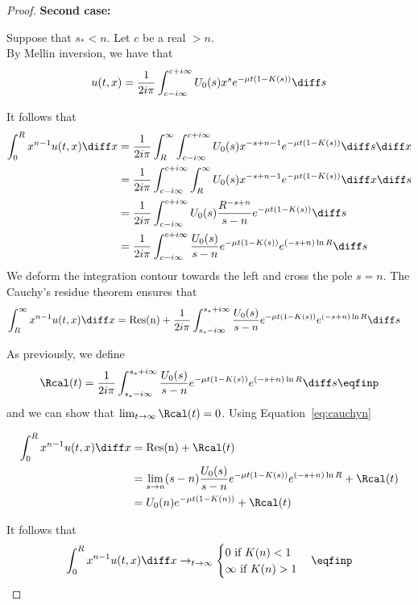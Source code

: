 \begin{proof}
\textbf{Second case:}

Suppose that $s_* < n$. Let $c$ be a real $>n$. \\
    By Mellin inversion, we have that
    \begin{align*}
        u(t,x) = \frac{1}{2i\pi}\int_{c-i\infty}^{c+i\infty} U_0(s) x^{s} e^{-\mu t(1 - K(s))} \diff s
    \end{align*}

It follows that
\begin{align*}
    \int_0^R x^{n-1}u(t,x) \diff x 
    &= \frac{1}{2i\pi} \int_R^{\infty} \int_{c-i\infty}^{c+i\infty} U_0(s) x^{-s+n-1} e^{-\mu t(1 - K(s))} \diff s \diff x \\
    &= \frac{1}{2i\pi} \int_{c-i\infty}^{c+i\infty} \int_R^{\infty} U_0(s) x^{-s+n-1} e^{-\mu t(1 - K(s))} \diff x \diff s \\
    &= \frac{1}{2i\pi} \int_{c-i\infty}^{c+i\infty} U_0(s) \frac{R^{-s+n}}{s-n} e^{-\mu t(1 - K(s))} \diff s \\
    &= \frac{1}{2i\pi} \int_{c-i\infty}^{c+i\infty} \frac{U_0(s)}{s-n} e^{-\mu t(1 - K(s))} e^{(-s+n)\ln R} \diff s
\end{align*}
We deform the integration contour towards the left and cross the pole $s = n$. The Cauchy's residue theorem ensures that
\begin{align}
    \int_R^{\infty} x^{n-1}u(t,x) \diff x &= \mathrm{Res(n)} + \frac{1}{2i\pi} \int_{s_*-i\infty}^{s_*+i\infty} \frac{U_0(s)}{s-n} e^{-\mu t(1 - K(s))} e^{(-s+n)\ln R} \diff s 
    \label{eq:cauchyn}
\end{align}


As previously, we define
\begin{align*}
    \Rcal(t) = \frac{1}{2i\pi} \int_{s_*-i\infty}^{s_*+i\infty} \frac{U_0(s)}{s-n} e^{-\mu t(1 - K(s))} e^{(-s+n)\ln R} \diff s
    \eqfinp
\end{align*}
and we can show that $\lim_{t\to\infty}\Rcal(t) = 0$. Using Equation~\ref{eq:cauchyn}


\begin{align*}
    \int_0^R x^{n-1}u(t,x) \diff x &= \mathrm{Res(n)} + \Rcal(t) \\
    &= \lim_{s \to n} (s-n)\frac{U_0(s)}{s-n} e^{-\mu t(1 - K(s))} e^{(-s+n)\ln R}  + \Rcal(t)\\
    &= U_0(n)e^{-\mu t(1 - K(n))} + \Rcal(t)\\
\end{align*}

It follows that 
\begin{equation}
    \int_0^R x^{n-1}u(t,x) \diff x \to_{t \to \infty}
    \begin{cases}
    0 \text{ if $K(n) < 1$}\\
    \infty \text{ if $K(n) > 1$}
    \end{cases}
    \eqfinp
\end{equation}

\end{proof}

